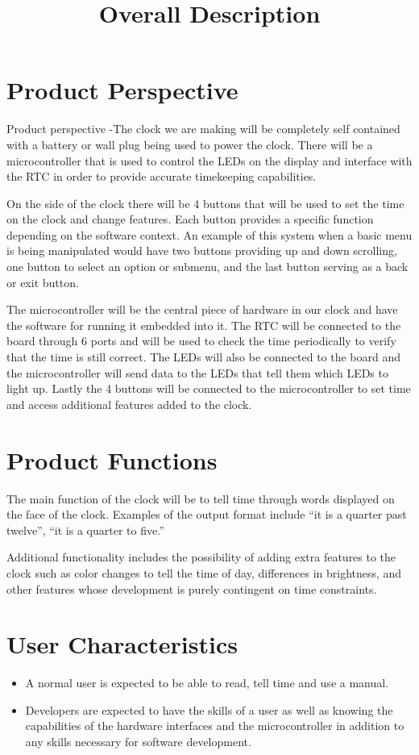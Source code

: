 \documentclass[10pt,draftclsnofoot,onecolumn]{IEEEtran}
\begin{document}
\newpage
\title{Overall Description}
\section{Product Perspective}
Product perspective -The clock we are making will be completely self contained with a battery
or wall plug being used to power the clock. There will be a microcontroller that is used to
control the LEDs on the display and interface with the RTC in order to provide accurate
timekeeping capabilities.

On the side of the clock there will be 4 buttons that will be used to set the time on the
clock and change features. Each button provides a specific function depending on the software
context. An example of this system when a basic menu is being manipulated would have two
buttons providing up and down scrolling, one button to select an option or submenu, and the
last button serving as a back or exit button.

The microcontroller will be the central piece of hardware in our clock and have the software
for running it embedded into it. The RTC will be connected to the board through 6 ports and
will be used to check the time periodically to verify that the time is still correct. The LEDs
will also be connected to the board and the microcontroller will send data to the LEDs that
tell them which LEDs to light up. Lastly the 4 buttons will be connected to the
microcontroller to set time and access additional features added to the clock.

\section{Product Functions}
The main function of the clock will be to tell time through words displayed on the face of the
clock. Examples of the output format include “it is a quarter past twelve”, “it is a quarter to
five.”

Additional functionality includes the possibility of adding extra features to the clock such as
color changes to tell the time of day, differences in brightness, and other features whose
development is purely contingent on time constraints.

\section{User Characteristics}
\begin{itemize}
  \item A normal user is expected to be able to read, tell time and use a manual.
  \item Developers are expected to have the skills of a user as well as knowing the
  capabilities of the hardware interfaces and the microcontroller in addition to any skills
  necessary for software development.
\end{itemize}
\end{document}
